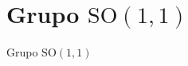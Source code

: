 \section[Grupo SO(1,1)]{Grupo \(\mathrm{SO}(1,1)\)}
\begin{definition}{Grupo \(\mathrm{SO}(1,1)\)}{}

\end{definition}
